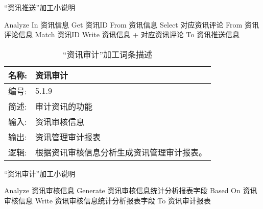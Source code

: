 \begin{algorithm}[H]
    \renewcommand{\thealgorithm}{}
    \caption{“资讯推送”加工小说明} 
    \label{alg3} 
    \begin{algorithmic}[1]
        \STATE Analyze In 资讯信息
        \STATE Get 资讯ID From 资讯信息
        \STATE Select 对应资讯评论 From 资讯评论信息 Match 资讯ID
        \STATE Write 资讯信息 + 对应资讯评论 To 资讯推送信息
    \end{algorithmic} 
\end{algorithm}

\begin{table}[H]  
\caption{“资讯审计”加工词条描述}  
\begin{center}  
    \begin{tabular}{l p{11cm}} 
        \hline
        \quad 名称:  & 资讯审计 \\
        \hline
        \quad 编号:  & 5.1.9 \\
        \hline
        \quad 简述:  & 审计资讯的功能 \\
        \hline
        \quad 输入:  & 资讯审核信息 \\
        \hline
        \quad 输出:  & 资讯管理审计报表 \\
        \hline
        \quad 逻辑:  & 根据资讯审核信息分析生成资讯管理审计报表。 \\
        \hline
    \end{tabular}
    \label{tab1}
\end{center}
\end{table}

\begin{algorithm}[H]
    \renewcommand{\thealgorithm}{}
    \caption{“资讯审计”加工小说明} 
    \label{alg3} 
    \begin{algorithmic}[1]
        \STATE Analyze 资讯审核信息
        \STATE Generate 资讯审核信息统计分析报表字段 Based On 资讯审核信息
        \STATE Write 资讯审核信息统计分析报表字段 To 资讯审计报表
    \end{algorithmic} 
\end{algorithm}
